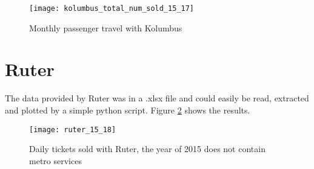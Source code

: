 \begin{figure}[ht]
\texttt{[image: kolumbus\_total\_num\_sold\_15\_17]}
\centering
\caption{Monthly passenger travel with Kolumbus}
\label{fig:kolumbus_15_17}
\end{figure}

\section{Ruter}
The data provided by Ruter was in a .xlsx file and could easily be read, extracted and plotted by a simple python script. Figure \ref{fig:ruter_15_18} shows the results.

\begin{figure}[ht]
\texttt{[image: ruter\_15\_18]}
\centering
\caption{Daily tickets sold with Ruter, the year of 2015 does not contain metro services}
\label{fig:ruter_15_18}
\end{figure}
